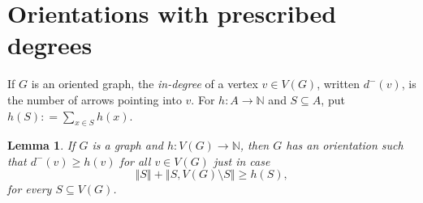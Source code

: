 \documentclass[openany]{tufte-book} %
\theoremstyle{plain}
\newtheorem{lemma}{Lemma}
\newcommand{\size}[1]{\left\Vert#1\right\Vert}
\newcommand{\func}[3]{#1\colon #2 \rightarrow #3}
\newcommand{\DefinedAs}{\mathrel{\mathop:}=}
\newcommand{\IN}{\mathbb{N}}
\begin{document}
\section{Orientations with prescribed degrees}
If $G$ is an oriented graph, the \emph{in-degree} of a vertex $v \in V(G)$, written $d^-(v)$, is the number of arrows
pointing into $v$.  For $\func{h}{A}{\IN}$ and $S \subseteq A$, put $h(S) \DefinedAs \sum_{x \in S} h(x)$.

\begin{lemma}\label{InOrientations} If $G$ is a graph and $\func{h}{V(G)}{\IN}$,
then $G$ has an orientation such that $d^{-}(v)\ge h(v)$ for all $v\in V(G)$ just in case
\begin{equation}
\size{S}+\size{S,V(G)\setminus S}\ge h(S),
\end{equation}
for every $S \subseteq V(G)$.
\end{lemma}
\end{document}
